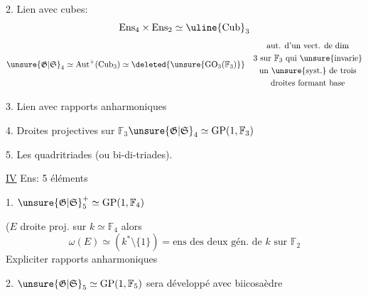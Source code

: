 2. Lien avec cubes:
\[
\mathrm{Ens}_4\times\mathrm{Ens}_2\simeq\uline{\mathrm{Cub}}_3
\]
\[
\unsure{\mathfrak G|\mathfrak S}_4\simeq\operatorname{Aut}^+(\mathrm{Cub}_3)\simeq\deleted{\unsure{\mathrm{GO}_3(\mathbb F_3)}}\quad\begin{gathered}
\text{aut. d'un vect. de dim}\\
\text{3 sur }\mathbb F_3\text{ qui \unsure{invarie}}\\
\text{un \unsure{syst.} de trois}\\
\text{droites formant base}
\end{gathered}
\]

3. Lien avec rapports anharmoniques

4. Droites projectives sur $\mathbb F_3$\quad $\unsure{\mathfrak G|\mathfrak S}_4\simeq\mathrm{GP}(1,\mathbb F_3)$

5. Les quadritriades (ou bi-di-triades).


\uline{IV} Ens: 5 éléments


1. $\unsure{\mathfrak G|\mathfrak S}_5^+\simeq\mathrm{GP}(1,\mathbb F_4)$


 ($E$ droite proj. sur $k\simeq\mathbb F_4$ alors
\[
\omega(E)\simeq(k^*\setminus\{1\})=\text{ens des deux gén. de }k\text{ sur }\mathbb F_2
\]
Expliciter rapports anharmoniques

2. $\unsure{\mathfrak G|\mathfrak S}_5\simeq\mathrm{GP}(1,\mathbb F_5)$ sera développé avec  biicosaèdre
